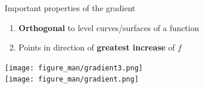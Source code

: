 \documentclass[11pt,compress,t,notes=noshow, xcolor=table]{beamer}
\begin{document}
\begin{vbframe}{Important properties of the gradient}

\begin{enumerate}
	\item \textbf{Orthogonal} to level curves/surfaces of a function\,\\
	\item Points in direction of \textbf{greatest increase} of $f$\end{enumerate}
	\begin{center}
		\texttt{[image: figure\_man/gradient3.png]} \\\texttt{[image: figure\_man/gradient.png]}
	\end{center}
\end{vbframe}
\end{document}
